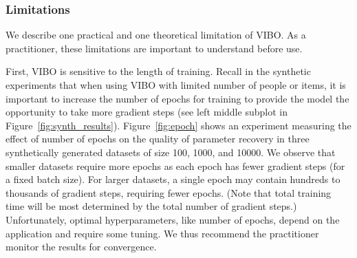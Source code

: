 \subsubsection{Limitations}

We describe one practical and one theoretical limitation of VIBO.
As a practitioner, these limitations are important to understand before use.

First, VIBO is sensitive to the length of training. Recall in the synthetic experiments that when using VIBO with limited number of people or items, it is important to increase the number of epochs for training to provide the model the opportunity to take more gradient steps (see left middle subplot in Figure~\ref{fig:synth_results}). 
Figure~\ref{fig:epoch} shows an experiment measuring the effect of number of epochs on the quality of parameter recovery in three synthetically generated datasets of size 100, 1000, and 10000. We observe that smaller datasets require more epochs as each epoch has fewer gradient steps (for a fixed batch size). For larger datasets, a single epoch may contain hundreds to thousands of gradient steps, requiring fewer epochs. (Note that total training time will be most determined by the total number of gradient steps.)
Unfortunately, optimal hyperparameters, like number of epochs, depend on the application and require some tuning. 
We thus recommend the practitioner monitor the results for convergence.


